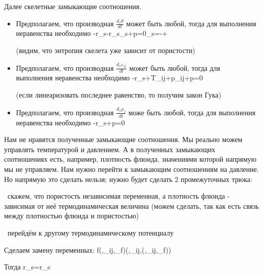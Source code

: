 \documentclass[main.tex]{subfiles}
\begin{document}
Далее скелетные замыкающие соотношения.

\begin{itemize}
\item Предполагаем, что производная $\displaystyle{}\frac{d_s\theta}{dt}$ может быть любой, тогда для выполнения неравенства необходимо 
\beq
-r_s-r_s\eta_s+p\frac{\partial\varphi}{\partial\theta}=0\Rightarrow\eta_s=-+\frac{\partial\varphi}{\partial\theta}
\eeq

(видим, что энтропия скелета уже зависит от пористости)

\item Предполагаем, что производная $\displaystyle{}\frac{d_s\varepsilon_{ij}}{dt}$ может быть любой, тогда для выполнения неравенства необходимо 
\beq
-r_s+T_{ij}+p\varphi\delta_{ij}+p=0
\eeq

(если линеаризовать последнее равенство, то получим закон Гука)

\item Предполагаем, что производная $\displaystyle{}\frac{d_s\rho_f}{dt}$ може быть любой, тогда для выполнения неравенства необходимо 
\beq
-r_s+p=0
\eeq
\end{itemize}

Нам не нравятся полученные замыкающие соотношения. Мы реально можем управлять температурой и давлением. А в полученных замыкающих соотношениях есть, например, плотность флюида, значениями которой напрямую мы не управляем. Нам нужно перейти к замыкающим соотношениям на давление. Но напрямую это сделать нельзя; нужно будет сделать 2 промежуточных трюка:

\textbullet\ скажем, что пористость независимая переменная, а плотность флюида - зависимая от неё термодинамическая величина (можем сделать, так как есть связь между плотностью флюида и пористостью)

\textbullet\ перейдём к другому термодинамическому потенциалу

Сделаем замену переменных: 
\beq
f\left(\theta,\varepsilon_{ij},\rho_f\right)\rightarrow {}\left(\theta,\varepsilon_{ij},\varphi(\theta,\varepsilon_{ij},\rho_f)\right)
\eeq

Тогда
\beq
r_s=r_s
\eeq
\end{document}
